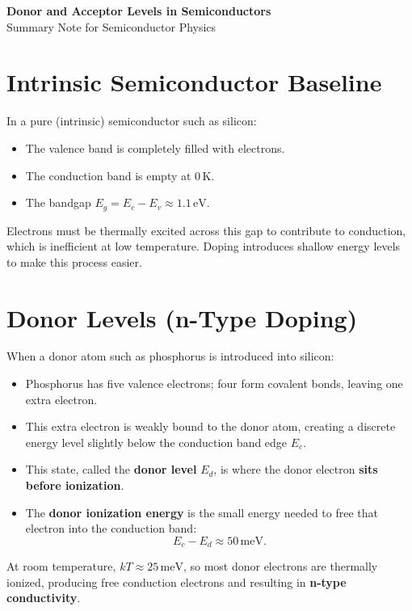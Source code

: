 \documentclass[12pt]{article}
\begin{document}
	
	\begin{center}
		{\LARGE \textbf{Donor and Acceptor Levels in Semiconductors}}\\[0.5em]
		{\large Summary Note for Semiconductor Physics}
	\end{center}
	\vspace{1em}
	
	\section{Intrinsic Semiconductor Baseline}
	In a pure (intrinsic) semiconductor such as silicon:
	\begin{itemize}
		\item The valence band is completely filled with electrons.
		\item The conduction band is empty at \(0\,\text{K}\).
		\item The bandgap \(E_g = E_c - E_v \approx 1.1\,\text{eV}\).
	\end{itemize}
	Electrons must be thermally excited across this gap to contribute to conduction, which is inefficient at low temperature. Doping introduces shallow energy levels to make this process easier.
	
	\section{Donor Levels (n-Type Doping)}
	When a donor atom such as phosphorus is introduced into silicon:
	\begin{itemize}
		\item Phosphorus has five valence electrons; four form covalent bonds, leaving one extra electron.
		\item This extra electron is weakly bound to the donor atom, creating a discrete energy level slightly below the conduction band edge \(E_c\).
		\item This state, called the \textbf{donor level} \(E_d\), is where the donor electron \textbf{sits before ionization}.
		\item The \textbf{donor ionization energy} is the small energy needed to free that electron into the conduction band:
		\[
		E_c - E_d \approx 50\,\text{meV}.
		\]
	\end{itemize}
	At room temperature, \(kT \approx 25\,\text{meV}\), so most donor electrons are thermally ionized, producing free conduction electrons and resulting in \textbf{n-type conductivity}.
	
\end{document}
